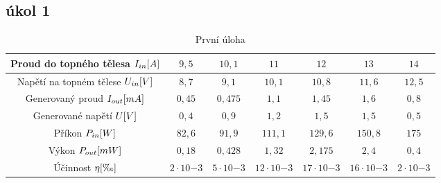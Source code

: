 \documentclass{article}
\begin{document}
\subsection{úkol 1}
\begin{minipage}[t]{\textwidth}
  \centering

  \begin{table}[H]
    \centering
    \begin{tabular}{|c|c|c|c|c|c|c|}
      \hline
      Proud do topného tělesa \(I_{in}\-[A]\)       & \(9,5\)           & \(10,1\)         & \(11\)             & \(12\)            & \(13\)            & \(14\)            \\ \hline
      Napětí na topném tělese \(U_{in}\-[V]\)       & \(8,7\)           & \(9,1\)          & \(10,1\)           & \(10,8\)          & \(11,6\)          & \(12,5\)          \\ \hline
      Generovaný proud \(I_{out}\-[mA]\)            & \(0,45\)          & \(0,475\)        & \(1,1\)            & \(1,45\)          & \(1,6\)           & \(0,8\)           \\ \hline
      Generované napětí \(U\-[V]\)                  & \(0,4\)           & \(0,9\)          & \(1,2\)            & \(1,5\)           & \(1,5\)           & \(0,5\)           \\ \hline \hline
      Příkon \(P_{in}\-[W]\)                        & \(82,6\)          & \(91,9\)         & \(111,1\)          & \(129,6\)         & \(150,8\)         & \(175\)           \\ \hline
      Výkon \(P_{out}\-[mW]\)                       & \(0,18\)          & \(0,428\)        & \(1,32\)           & \(2,175\)         & \(2,4\)           & \(0,4\)           \\ \hline
      Účinnost \(\eta\-[\text{\textperthousand}]\)  & \(2\cdot10{-3}\)  & \(5\cdot10{-3}\) & \(12\cdot10{-3}\)  & \(17\cdot10{-3}\) & \(16\cdot10{-3}\) & \(2\cdot10{-3}\)  \\ \hline
    \end{tabular}
    \caption{\label{tabulka_mereni} První úloha}
  \end{table}
\end{minipage}
\end{document}
